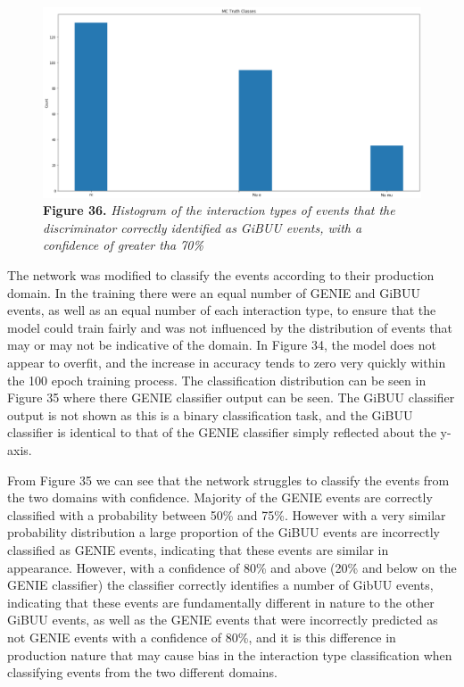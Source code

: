 \begin{figure}[t!]
 \centering
 \includegraphics[width=160mm]{Descr/int.png}
 \textbf{Figure 36.} \textit{Histogram of the interaction types of events that the discriminator correctly identified as GiBUU events, with a confidence of greater tha 70\%}
\end{figure}


\noindent The network was modified to classify the events according to their production domain. In the training there were an equal number of GENIE and GiBUU events, as well as an equal number of each interaction type, to ensure that the model could train fairly and was not influenced by the distribution of events that may or may not be indicative of the domain. In Figure 34, the model does not appear to overfit, and the increase in accuracy tends to zero very quickly within the 100 epoch training process. The classification distribution can be seen in Figure 35 where there GENIE classifier output can be seen. The GiBUU classifier output is not shown as this is a binary classification task, and the GiBUU classifier is identical to that of the GENIE classifier simply reflected about the y-axis. \medskip

\noindent From Figure 35 we can see that the network struggles to classify the events from the two domains with confidence. Majority of the GENIE events are correctly classified with a probability between 50\% and 75\%. However with a very similar probability distribution a large proportion of the GiBUU events are incorrectly classified as GENIE events, indicating that these events are similar in appearance. However, with a confidence of 80\% and above (20\% and below on the GENIE classifier) the classifier correctly identifies a number of GibUU events, indicating that these events are fundamentally different in nature to the other GiBUU events, as well as the GENIE events that were incorrectly predicted as not GENIE events with a confidence of 80\%, and it is this difference in production nature that may cause bias in the interaction type classification when classifying events from the two different domains.\medskip

